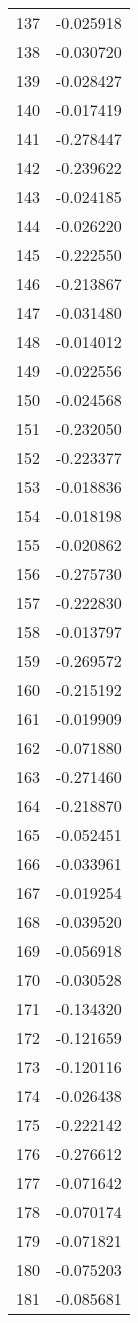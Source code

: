 \documentclass[12pt]{article}
\begin{document}
\begin{longtable}{@{}cc@{}}
137 & -0.025918 \\
138 & -0.030720 \\
139 & -0.028427 \\
140 & -0.017419 \\
141 & -0.278447 \\
142 & -0.239622 \\
143 & -0.024185 \\
144 & -0.026220 \\
145 & -0.222550 \\
146 & -0.213867 \\
147 & -0.031480 \\
148 & -0.014012 \\
149 & -0.022556 \\
150 & -0.024568 \\
151 & -0.232050 \\
152 & -0.223377 \\
153 & -0.018836 \\
154 & -0.018198 \\
155 & -0.020862 \\
156 & -0.275730 \\
157 & -0.222830 \\
158 & -0.013797 \\
159 & -0.269572 \\
160 & -0.215192 \\
161 & -0.019909 \\
162 & -0.071880 \\
163 & -0.271460 \\
164 & -0.218870 \\
165 & -0.052451 \\
166 & -0.033961 \\
167 & -0.019254 \\
168 & -0.039520 \\
169 & -0.056918 \\
170 & -0.030528 \\
171 & -0.134320 \\
172 & -0.121659 \\
173 & -0.120116 \\
174 & -0.026438 \\
175 & -0.222142 \\
176 & -0.276612 \\
177 & -0.071642 \\
178 & -0.070174 \\
179 & -0.071821 \\
180 & -0.075203 \\
181 & -0.085681 \\

\end{longtable}
\end{document}
